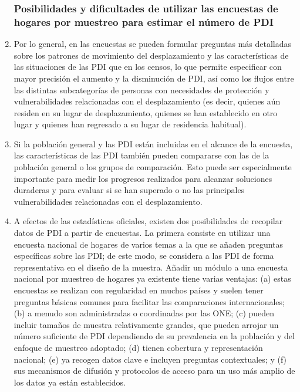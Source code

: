 \documentclass[
]{book}
\begin{document}
\begin{enumerate}
{  \subsubsection{Posibilidades y dificultades de utilizar las encuestas de hogares por muestreo para estimar el número de PDI}\label{posibilidades-y-dificultades-de-utilizar-las-encuestas-de-hogares-por-muestreo-para-estimar-el-nuxfamero-de-pdi}}
\item
  Por lo general, en las encuestas se pueden formular preguntas más detalladas sobre los patrones de movimiento del desplazamiento y las características de las situaciones de las PDI que en los censos, lo que permite especificar con mayor precisión el aumento y la disminución de PDI, así como los flujos entre las distintas subcategorías de personas con necesidades de protección y vulnerabilidades relacionadas con el desplazamiento (es decir, quienes aún residen en su lugar de desplazamiento, quienes se han establecido en otro lugar y quienes han regresado a su lugar de residencia habitual).
\item
  Si la población general y las PDI están incluidas en el alcance de la encuesta, las características de las PDI también pueden compararse con las de la población general o los grupos de comparación. Esto puede ser especialmente importante para medir los progresos realizados para alcanzar soluciones duraderas y para evaluar si se han superado o no las principales vulnerabilidades relacionadas con el desplazamiento.
\item
  A efectos de las estadísticas oficiales, existen dos posibilidades de recopilar datos de PDI a partir de encuestas. La primera consiste en utilizar una encuesta nacional de hogares de varios temas a la que se añaden preguntas específicas sobre las PDI; de este modo, se considera a las PDI de forma representativa en el diseño de la muestra. Añadir un módulo a una encuesta nacional por muestreo de hogares ya existente tiene varias ventajas: (a) estas encuestas se realizan con regularidad en muchos países y suelen tener preguntas básicas comunes para facilitar las comparaciones internacionales; (b) a menudo son administradas o coordinadas por las ONE; (c) pueden incluir tamaños de muestra relativamente grandes, que pueden arrojar un número suficiente de PDI dependiendo de su prevalencia en la población y del enfoque de muestreo adoptado; (d) tienen cobertura y representación nacional; (e) ya recogen datos clave e incluyen preguntas contextuales; y (f) sus mecanismos de difusión y protocolos de acceso para un uso más amplio de los datos ya están establecidos.

\end{enumerate}
\end{document}
